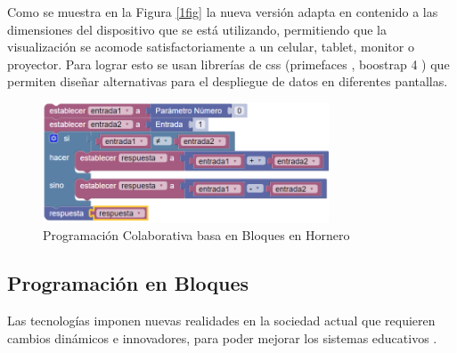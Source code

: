 \documentclass{articleteyet}
\begin{document}



Como se muestra en la Figura \ref{1fig} la nueva versión adapta en contenido a las dimensiones del dispositivo que se está utilizando, permitiendo que la visualización se acomode satisfactoriamente a un celular, tablet, monitor o proyector. Para lograr esto se usan librerías de css ({primefaces} \cite{bailey2015primefaces},
{boostrap 4} \cite{spurlock2013bootstrap}) que permiten diseñar alternativas para el despliegue de datos en diferentes pantallas. %


\begin{figure}
\begin{center}
\includegraphics[width=8.5cm]{img/programa.png}
\end{center}
\caption{Programación Colaborativa basa en Bloques en Hornero}
\label{2fig}
\end{figure}



\subsection{Programación en Bloques}

Las tecnologías imponen nuevas realidades en la sociedad actual que requieren cambios dinámicos e innovadores, para poder mejorar los sistemas educativos \cite{weintrop2019block}.
\end{document}
